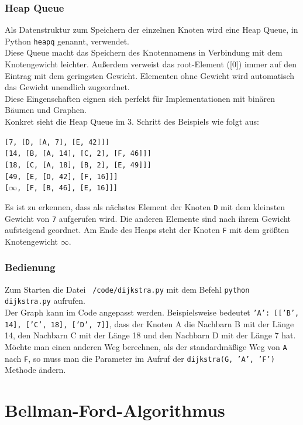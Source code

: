 \documentclass[12pt]{article}
\def\code#1{\texttt{#1}}
\begin{document}
		\subsubsection{Heap Queue}
			Als Datenstruktur zum Speichern der einzelnen Knoten wird eine Heap Queue, in Python \code{heapq} genannt, verwendet.\\
			Diese Queue macht das Speichern des Knotennamens in Verbindung mit dem Knotengewicht leichter. Außerdem verweist das root-Element ([0]) immer auf den Eintrag mit dem geringsten Gewicht. Elementen ohne Gewicht wird automatisch das Gewicht unendlich zugeordnet. \cite{heapq}\\
			Diese Eingenschaften eignen sich perfekt für Implementationen mit binären Bäumen und Graphen.\\
			Konkret sieht die Heap Queue im 3. Schritt des Beispiels wie folgt aus:
			\begin{center}
				\code{[7, [D, [A, 7], [E, 42]]]}\\
				\code{[14, [B, [A, 14], [C, 2], [F, 46]]]}\\
				\code{[18, [C, [A, 18], [B, 2], [E, 49]]]}\\
				\code{[49, [E, [D, 42], [F, 16]]]}\\
				\code{[$\infty$, [F, [B, 46], [E, 16]]]}\\
			\end{center}
			Es ist zu erkennen, dass als nächstes Element der Knoten \code{D} mit dem kleinsten Gewicht von \code{7} aufgerufen wird. Die anderen Elemente sind nach ihrem Gewicht aufsteigend geordnet. Am Ende des Heaps steht der Knoten \code{F} mit dem größten Knotengewicht \code{$\infty$}.
		
		\subsubsection{Bedienung}
			Zum Starten die Datei \code{~/code/dijkstra.py} mit dem Befehl \code{python dijkstra.py} aufrufen.\\
			Der Graph kann im Code angepasst werden. Beispielsweise bedeutet \code{'A': [['B', 14], ['C', 18], ['D', 7]]}, dass der Knoten A die Nachbarn B mit der Länge 14, den Nachbarn C mit der Länge 18 und den Nachbarn D mit der Länge 7 hat.\\
			Möchte man einen anderen Weg berechnen, als der standardmäßige Weg von \code{A} nach \code{F}, so muss man die Parameter im Aufruf der \code{dijkstra(G, 'A', 'F')} Methode ändern. 
	

\newpage
\section{Bellman-Ford-Algorithmus}
\end{document}
